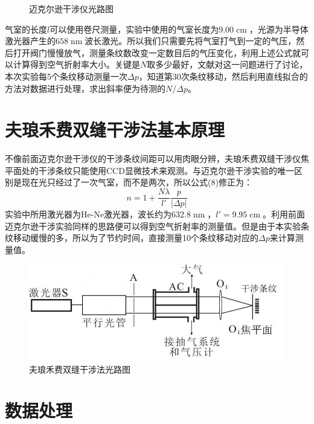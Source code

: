 \documentclass{WHUReport}
\begin{document}
\begin{multicols}{2}
\begin{figure}[H]
		\caption{迈克尔逊干涉仪光路图}
	\end{figure}
	气室的长度$l$可以使用卷尺测量，实验中使用的气室长度为$9.00\operatorname{cm}$，光源为半导体激光器产生的$658\operatorname{nm}$波长激光。所以我们只需要先将气室打气到一定的气压，然后打开阀门慢慢放气，测量条纹数改变一定数目后的气压变化，利用上述公式就可以计算得到空气折射率大小。关键是$N$取多少最好，文献对这一问题进行了讨论，本次实验每5个条纹移动测量一次$\Delta p$，知道第30次条纹移动，然后利用直线拟合的方法对数据进行处理，求出斜率便为待测的$N/\Delta p$。
	\section{夫琅禾费双缝干涉法基本原理}
	不像前面迈克尔逊干涉仪的干涉条纹间距可以用肉眼分辨，夫琅禾费双缝干涉仪焦平面处的干涉条纹只能使用CCD显微技术来观测。与迈克尔逊干涉实验的唯一区别是现在光只经过了一次气室，而不是两次，所以公式(8)修正为：
	\begin{equation}
		n=1+\frac{N\lambda}{l'}\frac p{|\Delta p|}
	\end{equation}
	实验中所用激光器为He-Ne激光器，波长约为$632.8\operatorname{nm}$，$l'=9.95\operatorname{cm}$。利用前面迈克尔逊干涉实验同样的思路便可以得到空气折射率的测量值。但是由于本实验条纹移动缓慢的多，所以为了节约时间，直接测量10个条纹移动对应的$\Delta p$来计算测量值。
	\begin{figure}[H]
		\centering
		\includegraphics[width=\linewidth]{./figs/2.jpg}
		\caption{夫琅禾费双缝干涉法光路图}
	\end{figure}
	\section{数据处理}

\end{multicols}
\end{document}
